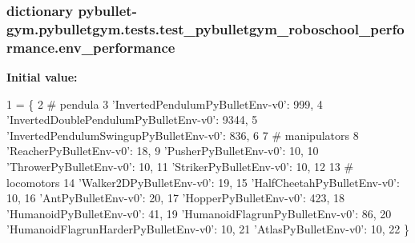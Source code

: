 \subsubsection[{\texorpdfstring{env\+\_\+performance}{env_performance}}]{\setlength{\rightskip}{0pt plus 5cm}dictionary pybullet-\/gym.\+pybulletgym.\+tests.\+test\+\_\+pybulletgym\+\_\+roboschool\+\_\+performance.\+env\+\_\+performance}\hypertarget{namespacepybullet-gym_1_1pybulletgym_1_1tests_1_1test__pybulletgym__roboschool__performance_a772266aa7f6a3d83ed27eb8094af6dc7}{}\label{namespacepybullet-gym_1_1pybulletgym_1_1tests_1_1test__pybulletgym__roboschool__performance_a772266aa7f6a3d83ed27eb8094af6dc7}
{\bfseries Initial value\+:}
\begin{DoxyCode}
1 = \{
2     \textcolor{comment}{# pendula}
3     \textcolor{stringliteral}{'InvertedPendulumPyBulletEnv-v0'}: 999,
4     \textcolor{stringliteral}{'InvertedDoublePendulumPyBulletEnv-v0'}: 9344,
5     \textcolor{stringliteral}{'InvertedPendulumSwingupPyBulletEnv-v0'}: 836,
6 
7     \textcolor{comment}{# manipulators}
8     \textcolor{stringliteral}{'ReacherPyBulletEnv-v0'}: 18,
9     \textcolor{stringliteral}{'PusherPyBulletEnv-v0'}: 10,
10     \textcolor{stringliteral}{'ThrowerPyBulletEnv-v0'}: 10,
11     \textcolor{stringliteral}{'StrikerPyBulletEnv-v0'}: 10,
12 
13     \textcolor{comment}{# locomotors}
14     \textcolor{stringliteral}{'Walker2DPyBulletEnv-v0'}: 19,
15     \textcolor{stringliteral}{'HalfCheetahPyBulletEnv-v0'}: 10,
16     \textcolor{stringliteral}{'AntPyBulletEnv-v0'}: 20,
17     \textcolor{stringliteral}{'HopperPyBulletEnv-v0'}: 423,
18     \textcolor{stringliteral}{'HumanoidPyBulletEnv-v0'}: 41,
19     \textcolor{stringliteral}{'HumanoidFlagrunPyBulletEnv-v0'}: 86,
20     \textcolor{stringliteral}{'HumanoidFlagrunHarderPyBulletEnv-v0'}: 10,
21     \textcolor{stringliteral}{'AtlasPyBulletEnv-v0'}: 10,
22 \}
\end{DoxyCode}
